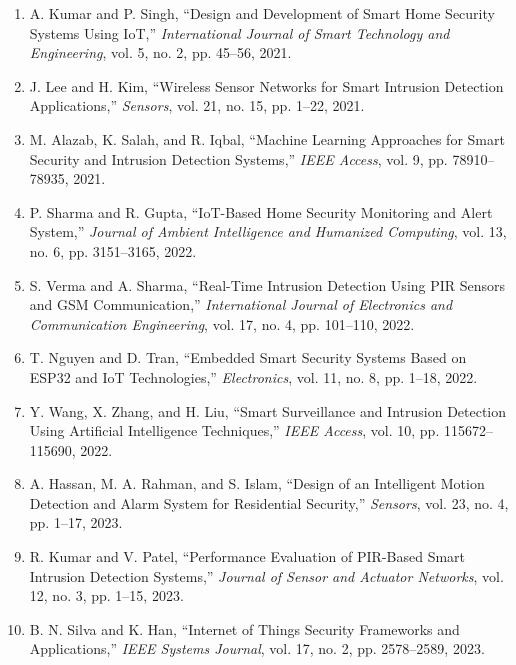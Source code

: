 \documentclass[12pt,a4paper,oneside]{report}
\begin{document}
\begin{enumerate}
\item \label{ref10} A. Kumar and P. Singh, ``Design and Development of Smart Home Security Systems Using IoT,'' \textit{International Journal of Smart Technology and Engineering}, vol. 5, no. 2, pp. 45--56, 2021.

\item \label{ref11} J. Lee and H. Kim, ``Wireless Sensor Networks for Smart Intrusion Detection Applications,'' \textit{Sensors}, vol. 21, no. 15, pp. 1--22, 2021.

\item \label{ref12} M. Alazab, K. Salah, and R. Iqbal, ``Machine Learning Approaches for Smart Security and Intrusion Detection Systems,'' \textit{IEEE Access}, vol. 9, pp. 78910--78935, 2021.

\item \label{ref13} P. Sharma and R. Gupta, ``IoT-Based Home Security Monitoring and Alert System,'' \textit{Journal of Ambient Intelligence and Humanized Computing}, vol. 13, no. 6, pp. 3151--3165, 2022.

\item \label{ref14} S. Verma and A. Sharma, ``Real-Time Intrusion Detection Using PIR Sensors and GSM Communication,'' \textit{International Journal of Electronics and Communication Engineering}, vol. 17, no. 4, pp. 101--110, 2022.

\item \label{ref15} T. Nguyen and D. Tran, ``Embedded Smart Security Systems Based on ESP32 and IoT Technologies,'' \textit{Electronics}, vol. 11, no. 8, pp. 1--18, 2022.

\item \label{ref16} Y. Wang, X. Zhang, and H. Liu, ``Smart Surveillance and Intrusion Detection Using Artificial Intelligence Techniques,'' \textit{IEEE Access}, vol. 10, pp. 115672--115690, 2022.

\item \label{ref17} A. Hassan, M. A. Rahman, and S. Islam, ``Design of an Intelligent Motion Detection and Alarm System for Residential Security,'' \textit{Sensors}, vol. 23, no. 4, pp. 1--17, 2023.

\item \label{ref18} R. Kumar and V. Patel, ``Performance Evaluation of PIR-Based Smart Intrusion Detection Systems,'' \textit{Journal of Sensor and Actuator Networks}, vol. 12, no. 3, pp. 1--15, 2023.

\item \label{ref19} B. N. Silva and K. Han, ``Internet of Things Security Frameworks and Applications,'' \textit{IEEE Systems Journal}, vol. 17, no. 2, pp. 2578--2589, 2023.


\end{enumerate}
\end{document}
